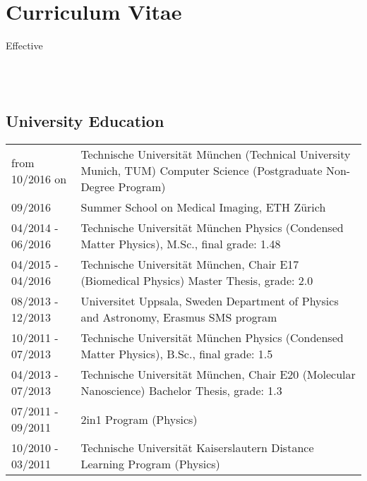 \documentclass[a4paper,10pt]{memoir}
\begin{document}
\section*{\color{MidnightBlue} Curriculum Vitae}

\begin{flushright}
  Effective \monthname \, \the\year
\end{flushright}


\\
\\

\subsection*{University Education}
\vspace*{-\baselineskip}
\begin{longtable}{@{}p{} p{}}
  from 10/2016 on &
  Technische Universität München (Technical University Munich, TUM) \newline
  Computer Science (Postgraduate Non-Degree Program) 
  \\
  09/2016 &
  Summer School on Medical Imaging, ETH Zürich 
  \\
  04/2014 - 06/2016 &
  Technische Universität München \newline 
  Physics (Condensed Matter Physics), M.Sc., final grade: 1.48
  \\
  04/2015 - 04/2016 &
  Technische Universität München, Chair E17 (Biomedical Physics) \newline 
  Master Thesis, grade: 2.0
  \\
  08/2013 - 12/2013 &
  Universitet Uppsala, Sweden \newline 
  Department of Physics and Astronomy, Erasmus SMS program 
  \\
  10/2011 - 07/2013 &
  Technische Universität München \newline 
  Physics (Condensed Matter Physics), B.Sc., final grade: 1.5 
  \\
  04/2013 - 07/2013 &
  Technische Universität München, Chair E20 (Molecular Nanoscience) \newline 
  Bachelor Thesis, grade: 1.3
  \\
  07/2011 - 09/2011 &
  2in1 Program (Physics)
  \\
  10/2010 - 03/2011 &
  Technische Universität Kaiserslautern \newline 
  Distance Learning Program (Physics)
\end{longtable}
\end{document}
